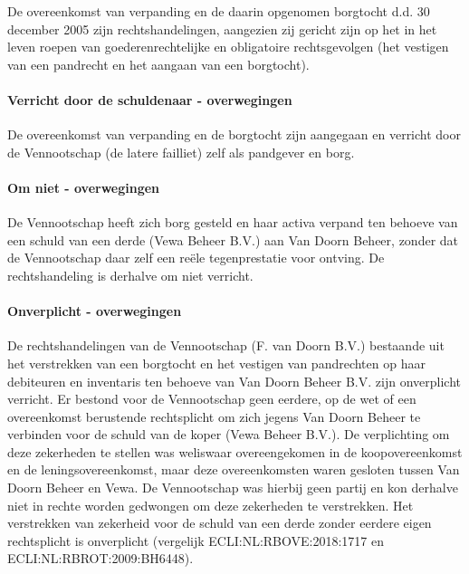 \documentclass[
  dutch,
  a4paper,
]{article}
\begin{document}
De overeenkomst van verpanding en de daarin opgenomen borgtocht d.d. 30 december 2005 zijn rechtshandelingen, aangezien zij gericht zijn op het in het leven roepen van goederenrechtelijke en obligatoire rechtsgevolgen (het vestigen van een pandrecht en het aangaan van een borgtocht).

\paragraph{Verricht door de schuldenaar - overwegingen}\label{verricht-door-de-schuldenaar---overwegingen-8}

De overeenkomst van verpanding en de borgtocht zijn aangegaan en verricht door de Vennootschap (de latere failliet) zelf als pandgever en borg.

\paragraph{Om niet - overwegingen}\label{om-niet---overwegingen-8}

De Vennootschap heeft zich borg gesteld en haar activa verpand ten behoeve van een schuld van een derde (Vewa Beheer B.V.) aan Van Doorn Beheer, zonder dat de Vennootschap daar zelf een reële tegenprestatie voor ontving. De rechtshandeling is derhalve om niet verricht.

\paragraph{Onverplicht - overwegingen}\label{onverplicht---overwegingen-8}

De rechtshandelingen van de Vennootschap (F. van Doorn B.V.) bestaande uit het verstrekken van een borgtocht en het vestigen van pandrechten op haar debiteuren en inventaris ten behoeve van Van Doorn Beheer B.V. zijn onverplicht verricht. Er bestond voor de Vennootschap geen eerdere, op de wet of een overeenkomst berustende rechtsplicht om zich jegens Van Doorn Beheer te verbinden voor de schuld van de koper (Vewa Beheer B.V.). De verplichting om deze zekerheden te stellen was weliswaar overeengekomen in de koopovereenkomst en de leningsovereenkomst, maar deze overeenkomsten waren gesloten tussen Van Doorn Beheer en Vewa. De Vennootschap was hierbij geen partij en kon derhalve niet in rechte worden gedwongen om deze zekerheden te verstrekken. Het verstrekken van zekerheid voor de schuld van een derde zonder eerdere eigen rechtsplicht is onverplicht (vergelijk ECLI:NL:RBOVE:2018:1717 en ECLI:NL:RBROT:2009:BH6448).
\end{document}
